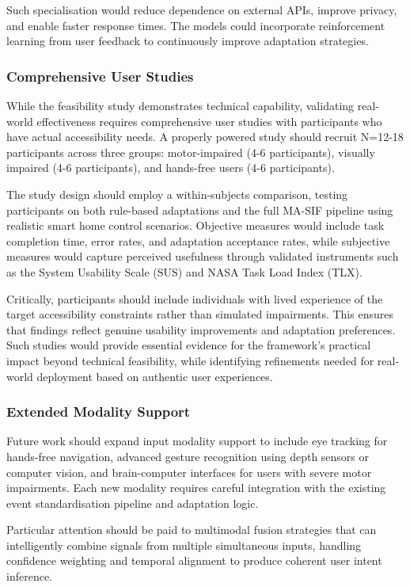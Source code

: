Such specialisation would reduce dependence on external APIs, improve privacy, and enable faster response times. The models could incorporate reinforcement learning from user feedback to continuously improve adaptation strategies.

\subsubsection{Comprehensive User Studies}
While the feasibility study demonstrates technical capability, validating real-world effectiveness requires comprehensive user studies with participants who have actual accessibility needs. A properly powered study should recruit N=12-18 participants across three groups: motor-impaired (4-6 participants), visually impaired (4-6 participants), and hands-free users (4-6 participants).

The study design should employ a within-subjects comparison, testing participants on both rule-based adaptations and the full MA-SIF pipeline using realistic smart home control scenarios. Objective measures would include task completion time, error rates, and adaptation acceptance rates, while subjective measures would capture perceived usefulness through validated instruments such as the System Usability Scale (SUS) and NASA Task Load Index (TLX).

Critically, participants should include individuals with lived experience of the target accessibility constraints rather than simulated impairments. This ensures that findings reflect genuine usability improvements and adaptation preferences. Such studies would provide essential evidence for the framework's practical impact beyond technical feasibility, while identifying refinements needed for real-world deployment based on authentic user experiences.

\subsubsection{Extended Modality Support}
Future work should expand input modality support to include eye tracking for hands-free navigation, advanced gesture recognition using depth sensors or computer vision, and brain-computer interfaces for users with severe motor impairments. Each new modality requires careful integration with the existing event standardisation pipeline and adaptation logic.

Particular attention should be paid to multimodal fusion strategies that can intelligently combine signals from multiple simultaneous inputs, handling confidence weighting and temporal alignment to produce coherent user intent inference.

